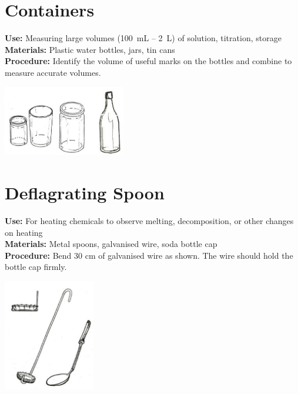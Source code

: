 \begin{multicols}{2}
\section{Containers}
\label{sec:containers}
\vspace{-10pt}
\textbf{Use:} Measuring large volumes (100~mL -- 2~L) of solution, titration, storage\\
\textbf{Materials:} Plastic water bottles, jars, tin cans\\
\textbf{Procedure:} Identify the volume of useful marks on the bottles 
and combine to measure accurate volumes.
\begin{center}
\includegraphics[width=0.4\textwidth]{./img/source/volumetric.jpg}
\end{center}


\section{Deflagrating Spoon}
\label{sec:deflagratingspoon}
\vspace{-10pt}
\textbf{Use:} For heating chemicals to observe melting, decomposition, or other changes on heating\\
\textbf{Materials:} Metal spoons, galvanised wire, soda bottle cap\\
\textbf{Procedure:} Bend 30 cm of galvanised wire as shown. The wire should hold the bottle cap firmly.
\begin{center}
\includegraphics[width=0.3\textwidth]{./img/source/deflagrating-spoon.jpg}
\end{center}


\end{multicols}
